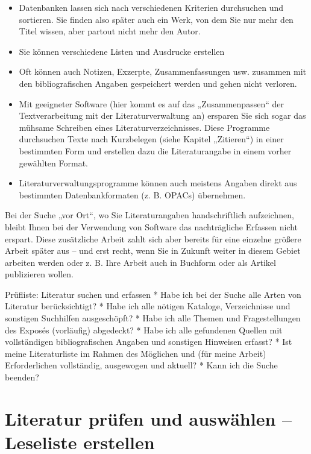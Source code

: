 \documentclass[]{book}
\providecommand{\tightlist}{%
  \setlength{\itemsep}{0pt}\setlength{\parskip}{0pt}}
\theoremstyle{definition}
\theoremstyle{definition}
\theoremstyle{definition}
\theoremstyle{remark}
\begin{document}
\begin{itemize}
\tightlist
\item
  Datenbanken lassen sich nach verschiedenen Kriterien durchsuchen und
  sortieren. Sie finden also später auch ein Werk, von dem Sie nur mehr
  den Titel wissen, aber partout nicht mehr den Autor.
\item
  Sie können verschiedene Listen und Ausdrucke erstellen
\item
  Oft können auch Notizen, Exzerpte, Zusammenfassungen usw. zusammen mit
  den bibliografischen Angaben gespeichert werden und gehen nicht
  verloren.
\item
  Mit geeigneter Software (hier kommt es auf das „Zusammenpassen`` der
  Textverarbeitung mit der Literaturverwaltung an) ersparen Sie sich
  sogar das mühsame Schreiben eines Literaturverzeichnisses. Diese
  Programme durchsuchen Texte nach Kurzbelegen (siehe Kapitel
  „Zitieren``) in einer bestimmten Form und erstellen dazu die
  Literaturangabe in einem vorher gewählten Format.
\item
  Literaturverwaltungsprogramme können auch meistens Angaben direkt aus
  bestimmten Datenbankformaten (z. B. OPACs) übernehmen.
\end{itemize}

Bei der Suche „vor Ort``, wo Sie Literaturangaben handschriftlich
aufzeichnen, bleibt Ihnen bei der Verwendung von Software das
nachträgliche Erfassen nicht erspart. Diese zusätzliche Arbeit zahlt
sich aber bereits für eine einzelne größere Arbeit später aus -- und
erst recht, wenn Sie in Zukunft weiter in diesem Gebiet arbeiten werden
oder z. B. Ihre Arbeit auch in Buchform oder als Artikel publizieren
wollen.

Prüfliste: Literatur suchen und erfassen * Habe ich bei der Suche alle
Arten von Literatur berücksichtigt? * Habe ich alle nötigen Kataloge,
Verzeichnisse und sonstigen Suchhilfen ausgeschöpft? * Habe ich alle
Themen und Fragestellungen des Exposés (vorläufig) abgedeckt? * Habe ich
alle gefundenen Quellen mit vollständigen bibliografischen Angaben und
sonstigen Hinweisen erfasst? * Ist meine Literaturliste im Rahmen des
Möglichen und (für meine Arbeit) Erforderlichen vollständig, ausgewogen
und aktuell? * Kann ich die Suche beenden?

\section{Literatur prüfen und auswählen -- Leseliste
erstellen}\label{literatur-prufen-und-auswahlen-leseliste-erstellen}
\end{document}
